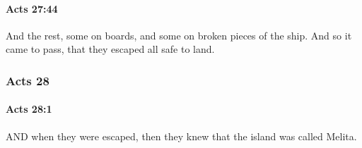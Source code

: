 		\paragraph{Acts 27:44} %
			\label{ACTS-27-44}

			And the rest, some on boards, and some on broken pieces of the ship.  And so it came to pass, that they escaped all safe to land.

			\begin{framed}
			\scriptsize
				\begin{compactdesc}
					\item[SBLG] 
				\end{compactdesc}
			\end{framed}

	\subsubsection{Acts 28} %
		\label{ACTS-28}
		
		\paragraph{Acts 28:1} %
			\label{ACTS-28-1}

			AND when they were escaped, then they knew that the island was called Melita.

